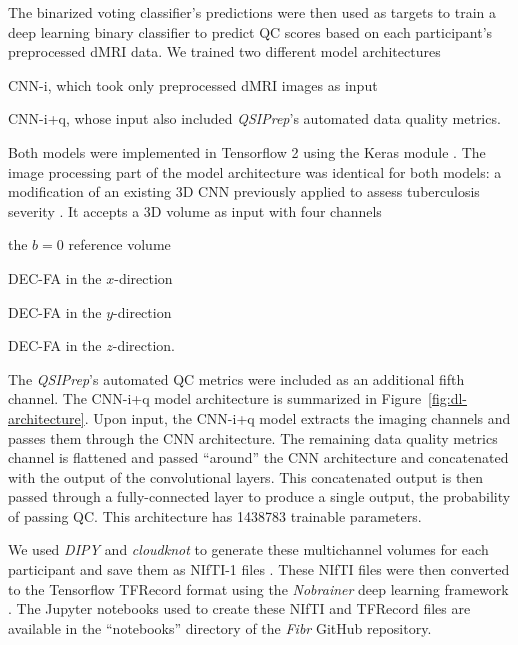 \documentclass[9pt,lineno]{elife}
\begin{document}
The binarized voting classifier's predictions were then used as targets to train a deep
learning binary classifier to predict QC scores based on each participant's preprocessed
dMRI data. We trained two different model architectures
\begin{enumerate*}[%
    label=(\roman*),%
    before=\unskip{: },%
    itemjoin={{, }},%
    itemjoin*={{ and }}]
    \item CNN-i, which took only preprocessed dMRI images as input
    \item CNN-i+q, whose input also included \emph{QSIPrep}'s automated data quality metrics.
\end{enumerate*}
Both models were implemented in Tensorflow 2 \citep{tensorflow} using the Keras
module \citep{keras}. The image processing part of the model architecture was
identical for both models: a modification of an existing 3D CNN
\citep{zunair2020-bs} previously applied to assess tuberculosis severity
\citep{dicente2019clef}. It accepts a 3D volume as input with four channels
\begin{enumerate*}[%
    label=(\roman*),%
    before=\unskip{: },%
    itemjoin={{, }},%
    itemjoin*={{ and }}]
    \item the $b=0$ reference volume
    \item DEC-FA in the $x$-direction
    \item DEC-FA in the $y$-direction
    \item DEC-FA in the $z$-direction.
\end{enumerate*}
The \emph{QSIPrep}'s automated QC metrics were included as an additional fifth
channel. The CNN-i+q model architecture is summarized in
Figure~\ref{fig:dl-architecture}. Upon input, the CNN-i+q model extracts the
imaging channels and passes them through the CNN architecture. The remaining data quality
metrics channel is flattened and passed ``around'' the CNN architecture and
concatenated with the output of the convolutional layers. This concatenated
output is then passed through a fully-connected layer to produce a single
output, the probability of passing QC. This architecture has \num{1438783} trainable
parameters.

We used \emph{DIPY} \citep{dipy} and \emph{cloudknot} \citep{cloudknot} to
generate these multichannel volumes for each participant and save them as NIfTI-1
files \citep{nifti}. These NIfTI files were then converted to the Tensorflow
TFRecord format using the \emph{Nobrainer} deep learning framework
\citep{nobrainer}. The Jupyter notebooks used to create these NIfTI and TFRecord
files are available in the ``notebooks'' directory of the \emph{Fibr} GitHub
repository.
\end{document}
